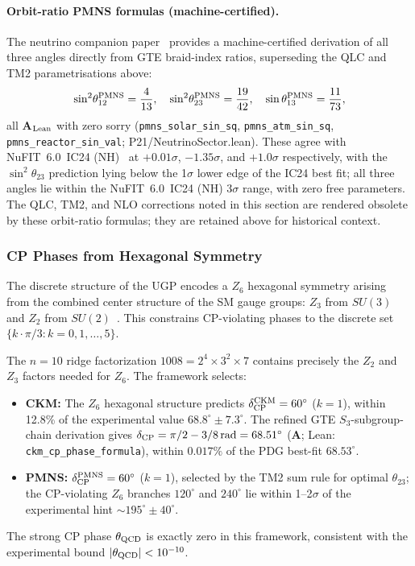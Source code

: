 \documentclass[11pt]{article}
\theoremstyle{remark}
\newcommand{\CatA}{\textbf{A}}
\newcommand{\CatAL}{\textbf{A}$_{\rm Lean}$}
\begin{document}
\paragraph{Orbit-ratio PMNS formulas (machine-certified).}
The neutrino companion paper~\cite{SpivackNeutrino} provides a machine-certified derivation of all three angles directly from GTE braid-index ratios, superseding the QLC and TM2 parametrisations above:
\begin{equation}
  \sin^2\!\theta_{12}^{\rm PMNS} = \frac{4}{13},\quad
  \sin^2\!\theta_{23}^{\rm PMNS} = \frac{19}{42},\quad
  \sin\theta_{13}^{\rm PMNS} = \frac{11}{73},
  \label{eq:pmns_orbit_ratios}
\end{equation}
all \CatAL{} with zero sorry (\texttt{pmns\_solar\_sin\_sq}, \texttt{pmns\_atm\_sin\_sq},
\texttt{pmns\_reactor\_sin\_val}; P21/NeutrinoSector.lean).
These agree with NuFIT~6.0~IC24 (NH)~\cite{NuFIT60} at $+0.01\sigma$, $-1.35\sigma$, and $+1.0\sigma$ respectively,
with the $\sin^2\theta_{23}$ prediction lying below the 1$\sigma$ lower edge of the IC24 best fit;
all three angles lie within the NuFIT~6.0~IC24 (NH) 3$\sigma$ range, with zero free parameters.
The QLC, TM2, and NLO corrections noted in this section are rendered obsolete by
these orbit-ratio formulas; they are retained above for historical context.

\subsubsection{CP Phases from Hexagonal Symmetry}
\label{subsec:cpphases}

The discrete structure of the UGP encodes a $Z_6$ hexagonal symmetry arising from the combined center structure of the SM gauge groups: $Z_3$ from $SU(3)$ and $Z_2$ from $SU(2)$~\cite{baez2003internal,Bakker2004HiddenSymmetry}.
This constrains CP-violating phases to the discrete set $\{k \cdot \pi/3 : k = 0, 1, \ldots, 5\}$.

The $n{=}10$ ridge factorization $1008 = 2^4 \times 3^2 \times 7$ contains precisely the $Z_2$ and $Z_3$ factors needed for $Z_6$.
The framework selects:
\begin{itemize}[leftmargin=1.2em,itemsep=0.2em]
    \item \textbf{CKM:} The $Z_6$ hexagonal structure predicts $\delta_{\rm CP}^{\rm CKM} = 60^\circ$ ($k{=}1$), within 12.8\% of the experimental value $68.8^\circ \pm 7.3^\circ$.  The refined GTE $S_3$-subgroup-chain derivation gives $\delta_{\rm CP} = \pi/2 - 3/8\,\mathrm{rad} = 68.51^\circ$ (\CatA; Lean: \texttt{ckm\_cp\_phase\_formula}), within $0.017\%$ of the PDG best-fit $68.53^\circ$.
    \item \textbf{PMNS:} $\delta_{\rm CP}^{\rm PMNS} = 60^\circ$ ($k{=}1$), selected by the TM2 sum rule for optimal $\theta_{23}$; the CP-violating $Z_6$ branches $120^\circ$ and $240^\circ$ lie within 1--2$\sigma$ of the experimental hint $\sim 195^\circ \pm 40^\circ$.
\end{itemize}
The strong CP phase $\theta_{\rm QCD}$ is exactly zero in this framework, consistent with the experimental bound $|\theta_{\rm QCD}| < 10^{-10}$.
\end{document}
